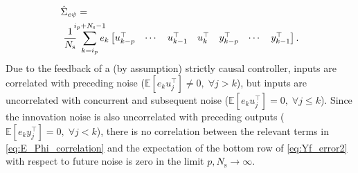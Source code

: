 \begin{align}\label{eq:E_Phi_correlation}
    \begin{split}
        &\hat{\Sigma}_{e\psi} = \\
        &\;\frac{1}{N_\mathrm{s}}\;\sum\limits_{k=i_p}^{\mathclap{i_p+N_\mathrm{s}-1}} e_k \begin{bmatrix}u_{k-p}^\top & \cdots & u_{k-1}^\top & u_k^\top & y_{k-p}^\top & \cdots & y_{k-1}^\top \end{bmatrix}.
    \end{split}
\end{align}
Due to the feedback of a (by assumption) strictly causal controller, inputs are correlated with preceding noise (${\mathbb{E}[e_k u_j^\top]\neq0,\; \forall j>k}$), but inputs are uncorrelated with concurrent and subsequent noise (${\mathbb{E}[e_k u_j^\top]=0,\; \forall j\leq k}$). Since the innovation noise is also uncorrelated with preceding outputs (${\mathbb{E}[e_k y_j^\top]=0,\; \forall j<k}$), there is no correlation between the relevant terms in \eqref{eq:E_Phi_correlation} and the expectation of the bottom row of \eqref{eq:Yf_error2} with respect to future noise is zero in the limit $p,N_\mathrm{s}\rightarrow\infty$.


